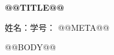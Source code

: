 \documentclass[12pt,a4paper]{ctexart}
\begin{document}
\begin{center}
  {\LARGE\bfseries @@TITLE@@}\par
  \vspace{0.8em}
  姓名：\underline{\hspace{5cm}}\hfill 学号：\underline{\hspace{5cm}}
  @@META@@
\end{center}
\vspace{0.8em}
@@BODY@@
\end{document}
